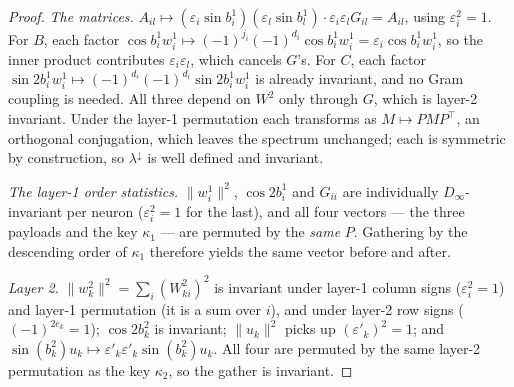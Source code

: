 \documentclass[10pt,letterpaper]{article}
\theoremstyle{definition}
\newcommand{\Dinf}{D_\infty}
\begin{document}
\begin{proof}
\emph{The matrices.} $A_{il} \mapsto (\varepsilon_i\sin b^1_i)(\varepsilon_l \sin b^1_l)\cdot
\varepsilon_i\varepsilon_l G_{il} = A_{il}$, using $\varepsilon_i^2 = 1$. For $B$, each factor
$\cos b^1_i w^1_i \mapsto (-1)^{j_i}(-1)^{d_i}\cos b^1_i w^1_i = \varepsilon_i \cos b^1_i w^1_i$,
so the inner product contributes $\varepsilon_i\varepsilon_l$, which cancels $G$'s. For $C$, each
factor $\sin 2b^1_i w^1_i \mapsto (-1)^{d_i}(-1)^{d_i}\sin 2b^1_i w^1_i$ is already invariant, and
no Gram coupling is needed. All three depend on $W^2$ only through $G$, which is layer-2 invariant.
Under the layer-1 permutation each transforms as $M \mapsto PMP^\top$, an orthogonal conjugation,
which leaves the spectrum unchanged; each is symmetric by construction, so
$\lambda^{\downarrow}$ is well defined and invariant.

\emph{The layer-1 order statistics.} $\|w^1_i\|^2$, $\cos 2b^1_i$ and $G_{ii}$ are individually
$\Dinf$-invariant per neuron ($\varepsilon_i^2 = 1$ for the last), and all four vectors --- the
three payloads and the key $\kappa_1$ --- are permuted by the \emph{same} $P$. Gathering by the
descending order of $\kappa_1$ therefore yields the same vector before and after.

\emph{Layer 2.} $\|w^2_k\|^2 = \sum_i (W^2_{ki})^2$ is invariant under layer-1 column signs
($\varepsilon_i^2=1$) and layer-1 permutation (it is a sum over $i$), and under layer-2 row signs
($(-1)^{2e_k}=1$); $\cos 2b^2_k$ is invariant; $\|u_k\|^2$ picks up $(\varepsilon'_k)^2 = 1$; and
$\sin(b^2_k)u_k \mapsto \varepsilon'_k\varepsilon'_k \sin(b^2_k)u_k$. All four are permuted by the
same layer-2 permutation as the key $\kappa_2$, so the gather is invariant.
\end{proof}
\end{document}
